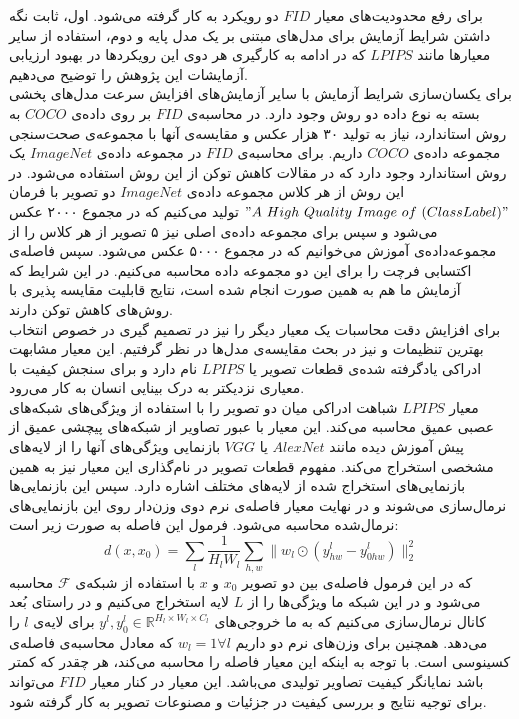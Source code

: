 برای رفع محدودیت‌های معیار $FID$ دو رویکرد به کار گرفته می‌شود. اول، ثابت نگه داشتن شرایط آزمایش برای مدل‌های مبتنی بر یک مدل پایه و دوم، استفاده از سایر معیارها مانند $LPIPS$ \cite{zhang2018unreasonable} که در ادامه به کارگیری هر دوی این رویکردها در بهبود ارزیابی  آزمایشات این پژوهش را توضیح می‌دهیم.
\\
 برای یکسان‌سازی شرایط آزمایش با سایر آزمایش‌های افزایش سرعت مدل‌های پخشی بسته به نوع داده دو روش وجود دارد. در محاسبه‌‌ی $FID$ بر روی داده‌ی $COCO$ به روش استاندارد، نیاز به تولید ۳۰ هزار عکس و مقایسه‌ی آنها با مجموعه‌ی صحت‌سنجی مجموعه داده‌ی $COCO$ داریم.  برای محاسبه‌ی $FID$ در مجموعه داده‌ی $ImageNet$ یک روش استاندارد وجود دارد که در مقالات کاهش توکن از این روش استفاده می‌شود. در این روش از هر کلاس مجموعه داده‌ی $ImageNet$ دو تصویر با فرمان $"A\ High\ Quality\  Image\  of\  (Class Label)"$ تولید می‌کنیم که در مجموع ۲۰۰۰ عکس می‌شود و سپس برای مجموعه داده‌ی اصلی نیز ۵ تصویر از هر کلاس را از مجموعه‌داده‌ی آموزش می‌خوانیم که در مجموع ۵۰۰۰ عکس می‌شود. سپس فاصله‌ی اکتسابی فرچت را برای این دو مجموعه داده محاسبه می‌کنیم. در این شرایط که آزمایش ما هم به همین صورت انجام شده است، نتایج قابلیت مقایسه پذیری با روش‌های کاهش توکن دارند.
 \\
 برای افزایش دقت محاسبات یک معیار دیگر را نیز در تصمیم گیری در خصوص انتخاب بهترین تنظیمات و نیز در بحث مقایسه‌ی مدل‌ها در نظر گرفتیم. این معیار مشابهت ادراکی یادگرفته شده‌ی قطعات تصویر یا $LPIPS$ \cite{zhang2018unreasonable}نام دارد و برای سنجش کیفیت با معیاری نزدیکتر به درک بینایی انسان به کار می‌رود.
\\
معیار $LPIPS$ شباهت ادراکی میان دو تصویر را با استفاده از ویژگی‌های شبکه‌های عصبی عمیق محاسبه می‌کند. این معیار با عبور تصاویر از شبکه‌های پیچشی عمیق از پیش آموزش دیده مانند $AlexNet$\cite{krizhevsky2012imagenet} یا $VGG$ \cite{simonyan2014very} بازنمایی ویژگی‌های آنها را از لایه‌های مشخصی استخراج می‌کند. مفهوم قطعات تصویر در نام‌گذاری این معیار نیز به همین بازنمایی‌های استخراج شده از لایه‌های مختلف اشاره دارد. سپس این بازنمایی‌ها نرمال‌سازی می‌شوند و در نهایت معیار فاصله‌ی نرم دوی وزن‌دار روی این بازنمایی‌های نرمال‌شده محاسبه می‌شود. فرمول این فاصله به صورت زیر است:
\begin{equation}
	d(x, x_0) = \sum_l \frac{1}{H_l W_l} \sum_{h, w} \|w_l \odot (y_{hw}^l - y_{0hw}^l)\|_2^2
\end{equation}
که در این فرمول فاصله‌ی بین دو تصویر $x_0$ و $x$ با استفاده از شبکه‌ی $\mathcal{F}$ محاسبه می‌شود و در این شبکه ما ویژگی‌ها را از $L$ لایه استخراج می‌کنیم و در راستای بُعد کانال نرمال‌سازی می‌کنیم که به ما خروجی‌های $y^l, y_0^l \in \mathbb{R}^{H_l \times W_l \times C_l}$ برای لایه‌ی $l$ را می‌دهد. همچنین برای وزن‌های نرم دو داریم $w_l = 1 \forall l$ که معادل محاسبه‌ی فاصله‌ی کسینوسی است. با توجه به اینکه این معیار فاصله را محاسبه می‌کند، هر چقدر که کمتر باشد نمایانگر کیفیت تصاویر تولیدی می‌باشد. این معیار در کنار معیار $FID$ می‌تواند برای توجیه نتایج و بررسی کیفیت در جزئیات و مصنوعات تصویر به کار گرفته شود.


